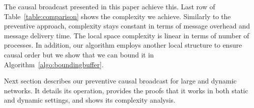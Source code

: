 %     


The causal broadcast presented in this paper achieve this.  Last row of
Table~\ref{table:comparison} shows the complexity we achieve. Similarly to the
preventive approach, complexity stays constant in terms of message overhead and
message delivery time. The local space complexity is linear in terms of number
of processes.  In
addition, our algorithm employs another local structure to ensure causal order
but we show that we can bound it in Algorithm~\ref{algo:boundingbuffer}.

Next section describes our preventive causal broadcast for large and dynamic
networks. It details its operation, provides the proofs that it works in both
static and dynamic settings, and shows its complexity analysis.



